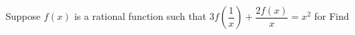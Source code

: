 Suppose $f(x)$ is a rational function such that $3f\left(\dfrac{1}{x}\right)+\dfrac{2f(x)}{x}=x^2$ for   Find 